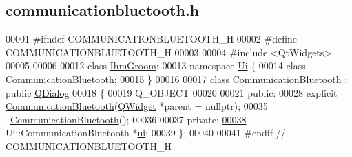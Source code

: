 \hypertarget{communicationbluetooth_8h_source}{}\subsection{communicationbluetooth.\+h}

\begin{DoxyCode}
00001 \textcolor{preprocessor}{#ifndef COMMUNICATIONBLUETOOTH\_H}
00002 \textcolor{preprocessor}{#define COMMUNICATIONBLUETOOTH\_H}
00003 
00004 \textcolor{preprocessor}{#include <QtWidgets>}
00005 
00006 
00012 \textcolor{keyword}{class }\hyperlink{class_ihm_groom}{IhmGroom};
00013 \textcolor{keyword}{namespace }\hyperlink{namespace_ui}{Ui} \{
00014 \textcolor{keyword}{class }\hyperlink{class_communication_bluetooth}{CommunicationBluetooth};
00015 \}
00016 
\hyperlink{class_communication_bluetooth}{00017} \textcolor{keyword}{class }\hyperlink{class_communication_bluetooth}{CommunicationBluetooth} : \textcolor{keyword}{public} \hyperlink{class_q_dialog}{QDialog}
00018 \{
00019     Q\_OBJECT
00020 
00021 \textcolor{keyword}{public}:
00028     \textcolor{keyword}{explicit} \hyperlink{class_communication_bluetooth}{CommunicationBluetooth}(\hyperlink{class_q_widget}{QWidget} *parent = \textcolor{keyword}{nullptr});
00035     ~\hyperlink{class_communication_bluetooth}{CommunicationBluetooth}();
00036 
00037 \textcolor{keyword}{private}:
\hyperlink{class_communication_bluetooth_a2721cf9f9503a98770981ffdad09f9a1}{00038}     Ui::CommunicationBluetooth *\hyperlink{class_communication_bluetooth_a2721cf9f9503a98770981ffdad09f9a1}{ui}; 
00039 \};
00040 
00041 \textcolor{preprocessor}{#endif // COMMUNICATIONBLUETOOTH\_H}
\end{DoxyCode}
